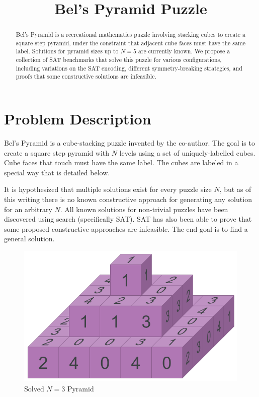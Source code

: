 \documentclass[conference]{IEEEtran}
\begin{document}
\title{Bel's Pyramid Puzzle}

\author{
\and
{}
}

\maketitle

\begin{abstract}
Bel's Pyramid is a recreational mathematics puzzle involving stacking cubes to create a square step pyramid,
under the constraint that adjacent cube faces must have the same label.
Solutions for pyramid sizes up to $N=5$ are currently known.
We propose a collection of SAT benchmarks that solve this puzzle for various configurations,
including variations on the SAT encoding, different symmetry-breaking strategies, and proofs
that some constructive solutions are infeasible.
\end{abstract}

\section{Problem Description}
Bel's Pyramid is a cube-stacking puzzle invented by the co-author.
The goal is to create a square step pyramid with $N$ levels using a set of uniquely-labelled cubes.
Cube faces that touch must have the same label.
The cubes are labeled in a special way that is detailed below.

It is hypothesized that multiple solutions exist for every puzzle size $N$, but as of this writing there is no known
constructive approach for generating any solution for an arbitrary $N$.
All known solutions for non-trivial puzzles have been discovered using search (specifically SAT).
SAT has also been able to prove that some proposed constructive approaches are infeasible.
The end goal is to find a general solution.

\begin{figure}[!t]
\centerline{\includegraphics[width=0.8\linewidth]{example.png}}
\caption{Solved $N=3$ Pyramid}
\label{example}
\end{figure}
\end{document}

